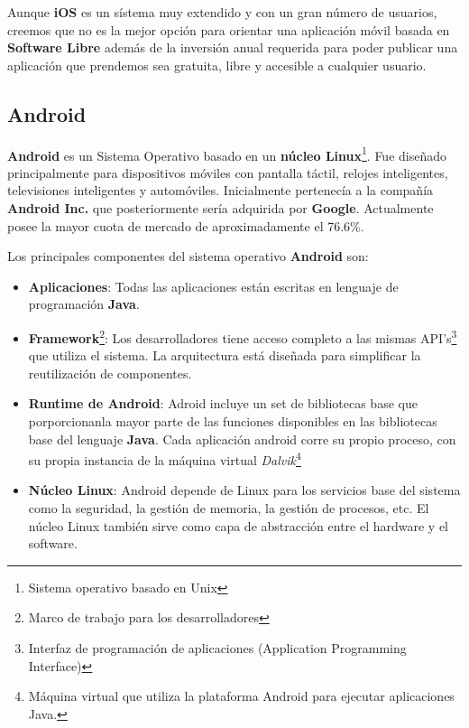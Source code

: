 \bigskip
Aunque \textbf{iOS} es un sístema muy extendido y con un gran número de usuarios, creemos que no es la mejor opción para orientar una aplicación móvil basada en \textbf{Software Libre} además de la inversión anual requerida para poder publicar una aplicación que prendemos sea gratuita, libre y accesible a cualquier usuario.


\subsection{Android}

\textbf{Android} es un Sistema Operativo basado en un \textbf{núcleo Linux}\footnote{Sistema operativo basado en Unix}. Fue diseñado principalmente para dispositivos móviles con pantalla táctil, relojes inteligentes, televisiones inteligentes y automóviles. Inicialmente pertenecía a la compañía \textbf{Android Inc.} que posteriormente sería adquirida por \textbf{Google}. Actualmente posee la mayor cuota de mercado de aproximadamente el 76.6\%.

\bigskip
Los principales componentes del sistema operativo \textbf{Android} son:


\begin{itemize}
  \item \textbf{Aplicaciones}: Todas las aplicaciones están escritas en lenguaje de programación \textbf{Java}.
  \item \textbf{Framework}\footnote{Marco de trabajo para los desarrolladores}: Los desarrolladores tiene acceso completo a las mismas API's\footnote{Interfaz de programación de aplicaciones (Application Programming Interface)} que utiliza el sistema. La arquitectura está diseñada para simplificar la reutilización de componentes.
  \item \textbf{Runtime de Android}: Adroid incluye un set de bibliotecas base que porporcionanla mayor parte de las funciones disponibles en las bibliotecas base del lenguaje \textbf{Java}. Cada aplicación android corre su propio proceso, con su propia instancia de la máquina virtual \textit{Dalvik}\footnote{Máquina virtual que utiliza la plataforma Android para ejecutar aplicaciones Java.}
  \item \textbf{Núcleo Linux}: Android depende de Linux para los servicios base del sistema como la seguridad, la gestión de memoria, la gestión de procesos, etc. El núcleo Linux también sirve como capa de abstracción entre el hardware y el software.
\end{itemize}

